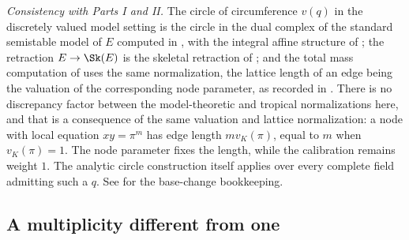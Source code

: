 \begin{example}
\emph{Consistency with Parts I and II.} The circle of circumference $v(q)$
in the discretely valued model setting is the circle in the dual complex
of the standard semistable model of $E$ computed
in , with the integral affine structure of
; the retraction $E\to\Sk(E)$ is the skeletal
retraction of ; and the total mass computation
of  uses the same normalization, the lattice length
of an edge being the valuation of the corresponding node parameter, as
recorded in . There is no discrepancy factor between
the model-theoretic and tropical normalizations here, and that is a
consequence of the same valuation and lattice normalization: a node with
local equation $xy=\pi^m$ has edge length $m v_K(\pi)$, equal to $m$ when
$v_K(\pi)=1$. The node parameter fixes the length, while the calibration
remains weight $1$. The analytic circle construction itself applies over
every complete field admitting such a $q$. See
 for the base-change
bookkeeping.
\end{example}

\subsection{A multiplicity different from one}

